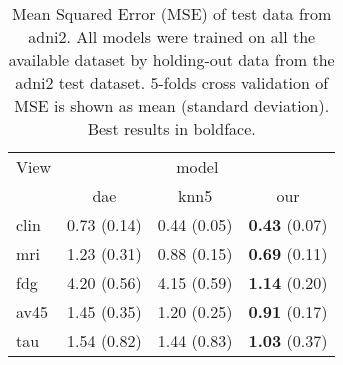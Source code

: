 \begin{table}[!t]
\caption{
Mean Squared Error (MSE) of test data from adni2.
All models were trained on all the available dataset by holding-out data from the adni2 test dataset.
$5$-folds cross validation of MSE is shown as mean (standard deviation).
Best results in boldface.
}
\centering
\label{table:model_comparison}
\begin{tabular}{lccc}
\toprule
View       &          \multicolumn{3}{c}{model}\\
           &          dae &         knn5 &           our \\ \cline{2-4}
clin       &  0.73 (0.14) &  0.44 (0.05) &  \textbf{0.43} (0.07) \\
mri        &  1.23 (0.31) &  0.88 (0.15) &  \textbf{0.69} (0.11) \\
fdg        &  4.20 (0.56) &  4.15 (0.59) &  \textbf{1.14} (0.20) \\
av45       &  1.45 (0.35) &  1.20 (0.25) &  \textbf{0.91} (0.17) \\
tau        &  1.54 (0.82) &  1.44 (0.83) &  \textbf{1.03} (0.37) \\
\bottomrule
\end{tabular}
\end{table}


